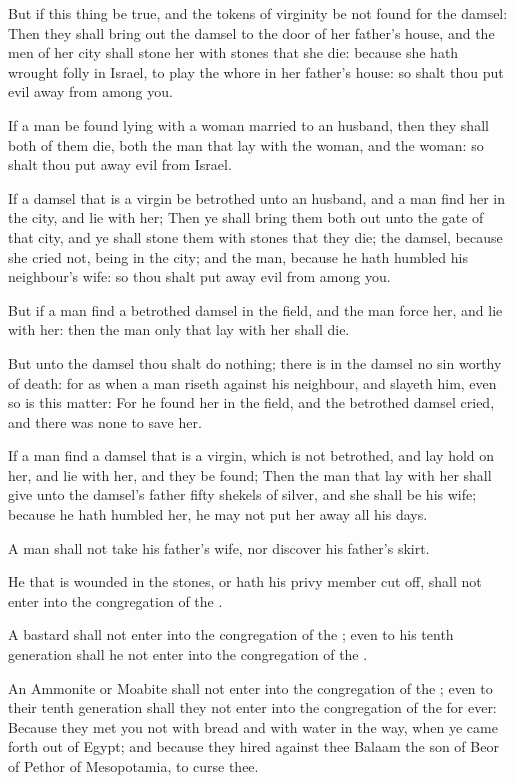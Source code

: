 \Verse But if this thing be true, and the tokens of virginity be not found for the damsel: \Verse Then they shall bring out the damsel to the door of her father's house, and the men of her city shall stone her with stones that she die: because she hath wrought folly in Israel, to play the whore in her father's house: so shalt thou put evil away from among you.

\Verse If a man be found lying with a woman married to an husband, then they shall both of them die, both the man that lay with the woman, and the woman: so shalt thou put away evil from Israel.

\Verse If a damsel that is a virgin be betrothed unto an husband, and a man find her in the city, and lie with her; \Verse Then ye shall bring them both out unto the gate of that city, and ye shall stone them with stones that they die; the damsel, because she cried not, being in the city; and the man, because he hath humbled his neighbour's wife: so thou shalt put away evil from among you.

\Verse But if a man find a betrothed damsel in the field, and the man force her, and lie with her: then the man only that lay with her shall die.

\Verse But unto the damsel thou shalt do nothing; there is in the damsel no sin worthy of death: for as when a man riseth against his neighbour, and slayeth him, even so is this matter: \Verse For he found her in the field, and the betrothed damsel cried, and there was none to save her.

\Verse If a man find a damsel that is a virgin, which is not betrothed, and lay hold on her, and lie with her, and they be found; \Verse Then the man that lay with her shall give unto the damsel's father fifty shekels of silver, and she shall be his wife; because he hath humbled her, he may not put her away all his days.

\Verse A man shall not take his father's wife, nor discover his father's skirt.


\Chapter
\Verse He that is wounded in the stones, or hath his privy member cut off, shall not enter into the congregation of the \LORD.

\Verse A bastard shall not enter into the congregation of the \LORD; even to his tenth generation shall he not enter into the congregation of the \LORD.

\Verse An Ammonite or Moabite shall not enter into the congregation of the \LORD; even to their tenth generation shall they not enter into the congregation of the \LORD for ever: \Verse Because they met you not with bread and with water in the way, when ye came forth out of Egypt; and because they hired against thee Balaam the son of Beor of Pethor of Mesopotamia, to curse thee.


